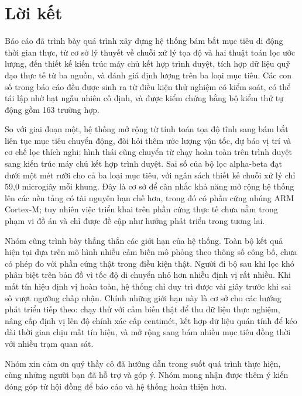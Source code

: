 ﻿\section*{Lời kết}
\thispagestyle{empty}

\hspace{0.5cm} Báo cáo đã trình bày quá trình xây dựng hệ thống bám bắt mục tiêu di động thời gian thực, từ cơ sở lý thuyết về chuỗi xử lý tọa độ và hai thuật toán lọc ước lượng, đến thiết kế kiến trúc máy chủ kết hợp trình duyệt, tích hợp dữ liệu quỹ đạo thực tế từ ba nguồn, và đánh giá định lượng trên ba loại mục tiêu. Các con số trong báo cáo đều được sinh ra từ điều kiện thử nghiệm có kiểm soát, có thể tái lập nhờ hạt ngẫu nhiên cố định, và được kiểm chứng bằng bộ kiểm thử tự động gồm 163 trường hợp.

So với giai đoạn một, hệ thống mở rộng từ tính toán tọa độ tĩnh sang bám bắt liên tục mục tiêu chuyển động, đòi hỏi thêm ước lượng vận tốc, dự báo vị trí và cơ chế lọc thích nghi; hình thái cũng chuyển từ chạy hoàn toàn trên trình duyệt sang kiến trúc máy chủ kết hợp trình duyệt. Sai số của bộ lọc alpha-beta đạt dưới một mét rưỡi cho cả ba loại mục tiêu, với ngân sách thiết kế chuỗi xử lý chỉ 59,0 microgiây mỗi khung. Đây là cơ sở để cân nhắc khả năng mở rộng hệ thống lên các nền tảng có tài nguyên hạn chế hơn, trong đó có phần cứng nhúng ARM Cortex-M; tuy nhiên việc triển khai trên phần cứng thực tế chưa nằm trong phạm vi đồ án và chỉ được đề cập như hướng phát triển trong tương lai.

Nhóm cũng trình bày thẳng thắn các giới hạn của hệ thống. Toàn bộ kết quả hiện tại dựa trên mô hình nhiễu cảm biến mô phỏng theo thông số công bố, chưa có phép đo với phần cứng thật trong điều kiện thật. Người đi bộ sau khi lọc khó phân biệt trên bản đồ vì tốc độ di chuyển nhỏ hơn nhiễu định vị rất nhiều. Khi mất tín hiệu định vị hoàn toàn, hệ thống chỉ duy trì được vài giây trước khi sai số vượt ngưỡng chấp nhận. Chính những giới hạn này là cơ sở cho các hướng phát triển tiếp theo: chạy thử với cảm biến thật để thu dữ liệu thực nghiệm, nâng cấp định vị lên độ chính xác cấp centimét, kết hợp dữ liệu quán tính để kéo dài thời gian chịu mất tín hiệu, và mở rộng sang bám nhiều mục tiêu đồng thời với nhiều trạm quan sát.

Nhóm xin cảm ơn quý thầy cô đã hướng dẫn trong suốt quá trình thực hiện, cùng những người bạn đã hỗ trợ và góp ý. Nhóm mong nhận được thêm ý kiến đóng góp từ hội đồng để báo cáo và hệ thống hoàn thiện hơn.

\clearpage
